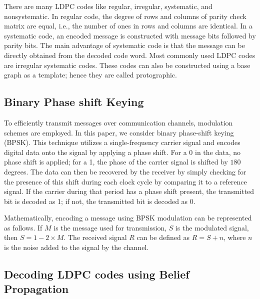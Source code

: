 There are many LDPC codes like regular, irregular, systematic, and nonsystematic. In regular code, the degree of rows and columns of parity check matrix are equal, i.e., the number of ones in rows and columns are identical. In a systematic code, an encoded message is constructed with message bits followed by parity bits. The main advantage of systematic code is that the message can be directly obtained from the decoded code word. Most commonly used LDPC codes are irregular systematic codes. These codes can also be constructed using a base graph as a template; hence they are called protographic.

\subsection{Binary Phase shift Keying}
To efficiently transmit messages over communication channels, modulation schemes are employed. In this paper, we consider binary phase-shift keying (BPSK). This technique utilizes a single-frequency carrier signal and encodes digital data onto the signal by applying a phase shift. For a 0 in the data, no phase shift is applied; for a 1, the phase of the carrier signal is shifted by $180$ degrees. The data can then be recovered by the receiver by simply checking for the presence of this shift during each clock cycle by comparing it to a reference signal. If the carrier during that period has a phase shift present, the transmitted bit is decoded as 1; if not, the transmitted bit is decoded as 0.


 
Mathematically, encoding a message using BPSK modulation can be represented as follows. If $M$ is the message used for transmission, $S$ is the modulated signal, then $S = 1-2 \times M$. The received signal $R$ can be defined as $R= S+ n$, where $n$ is the noise added to the signal by the channel. 

\subsection{Decoding LDPC codes using Belief Propagation}

